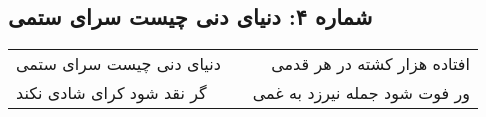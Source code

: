 \begin{center}
\section*{شماره ۴: دنیای دنی چیست سرای ستمی}
\label{sec:004}
\begin{longtable}{l p{0.5cm} r}
دنیای دنی چیست سرای ستمی
&&
افتاده هزار کشته در هر قدمی
\\
گر نقد شود کرای شادی نکند
&&
ور فوت شود جمله نیرزد به غمی
\\
\end{longtable}
\end{center}
